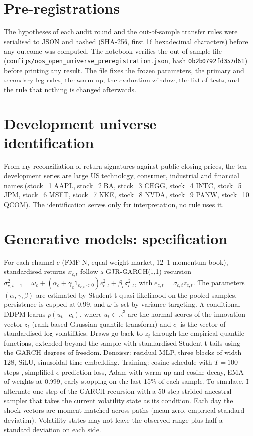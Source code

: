 \section{Pre-registrations}\label{app:prereg}

The hypotheses of each audit round and the out-of-sample transfer rules were serialised to JSON and hashed (SHA-256, first 16 hexadecimal characters) before any outcome was computed. The notebook verifies the out-of-sample file (\texttt{configs/oos\_open\_universe\_preregistration.json}, hash \texttt{0b2b0792fd357d61}) before printing any result. The file fixes the frozen parameters, the primary and secondary leg rules, the warm-up, the evaluation window, the list of tests, and the rule that nothing is changed afterwards.

\section{Development universe identification}

From my reconciliation of return signatures against public closing prices, the ten development series are large US technology, consumer, industrial and financial names (stock\_1 AAPL, stock\_2 BA, stock\_3 CHGG, stock\_4 INTC, stock\_5 JPM, stock\_6 MSFT, stock\_7 NKE, stock\_8 NVDA, stock\_9 PANW, stock\_10 QCOM). The identification serves only for interpretation, no rule uses it.

\section{Generative models: specification}

 For each channel $c$ (FMF-N, equal-weight market, 12--1 momentum book), standardised returns $x_{c,t}$ follow a GJR-GARCH(1,1) recursion $\sigma^2_{c,t+1}=\omega_c+(\alpha_c+\gamma_c\mathbf 1_{e_{c,t}<0})e^2_{c,t}+\beta_c\sigma^2_{c,t}$, with $e_{c,t}=\sigma_{c,t}z_{c,t}$. The parameters $(\alpha,\gamma,\beta)$ are estimated by Student-t quasi-likelihood on the pooled samples, persistence is capped at 0.99, and $\omega$ is set by variance targeting. A conditional DDPM learns $p(u_t\mid c_t)$, where $u_t\in\mathbb R^3$ are the normal scores of the innovation vector $z_t$ (rank-based Gaussian quantile transform) and $c_t$ is the vector of standardised log volatilities. Draws go back to $z_t$ through the empirical quantile functions, extended beyond the sample with standardised Student-t tails using the GARCH degrees of freedom. Denoiser: residual MLP, three blocks of width 128, SiLU, sinusoidal time embedding. Training: cosine schedule with $T=100$ steps \citep{nichol2021}, simplified $\epsilon$-prediction loss, Adam with warm-up and cosine decay, EMA of weights at 0.999, early stopping on the last 15\% of each sample. To simulate, I alternate one step of the GARCH recursion with a 50-step strided ancestral sampler \citep{song2021} that takes the current volatility state as its condition. Each day the shock vectors are moment-matched across paths (mean zero, empirical standard deviation). Volatility states may not leave the observed range plus half a standard deviation on each side.

